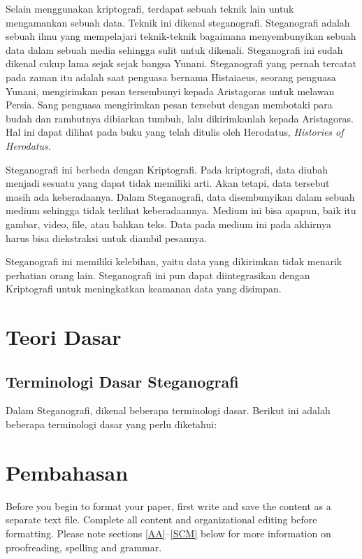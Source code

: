 \documentclass[10pt,conference]{IEEEtran}
\begin{document}
Selain menggunakan kriptografi, terdapat sebuah teknik lain untuk mengamankan sebuah data. Teknik ini dikenal steganografi. Steganografi adalah sebuah ilmu yang mempelajari teknik-teknik bagaimana menyembunyikan sebuah data dalam sebuah media sehingga sulit untuk dikenali. \cite{b1} Steganografi ini sudah dikenal cukup lama sejak sejak bangsa Yunani. Steganografi yang pernah tercatat pada zaman itu adalah saat penguasa bernama Histaiaeus, seorang penguasa Yunani, mengirimkan pesan tersembunyi kepada Aristagoras untuk melawan Persia. Sang penguasa mengirimkan pesan tersebut dengan membotaki para budah dan rambutnya dibiarkan tumbuh, lalu dikirimkanlah kepada Aristagoras. Hal ini dapat dilihat pada buku yang telah ditulis oleh Herodatus, \emph{Histories of Herodatus}.

Steganografi ini berbeda dengan Kriptografi. Pada kriptografi, data diubah menjadi sesuatu yang dapat tidak memiliki arti. Akan tetapi, data tersebut masih ada keberadaanya. Dalam Steganografi, data disembunyikan dalam sebuah medium sehingga tidak terlihat keberadaannya. Medium ini bisa apapun, baik itu gambar, video, file, atau bahkan teks. Data pada medium ini pada akhirnya harus bisa diekstraksi untuk diambil pesannya.

Steganografi ini memiliki kelebihan, yaitu data yang dikirimkan tidak menarik perhatian orang lain. Steganografi ini pun dapat diintegrasikan dengan Kriptografi untuk meningkatkan keamanan data yang disimpan.

\section{Teori Dasar}

\subsection{Terminologi Dasar Steganografi}

Dalam Steganografi, dikenal beberapa terminologi dasar. Berikut ini adalah beberapa terminologi dasar yang perlu diketahui:


\section{Pembahasan}
Before you begin to format your paper, first write and save the content as a 
separate text file. Complete all content and organizational editing before 
formatting. Please note sections \ref{AA}--\ref{SCM} below for more information on 
proofreading, spelling and grammar.
\end{document}
